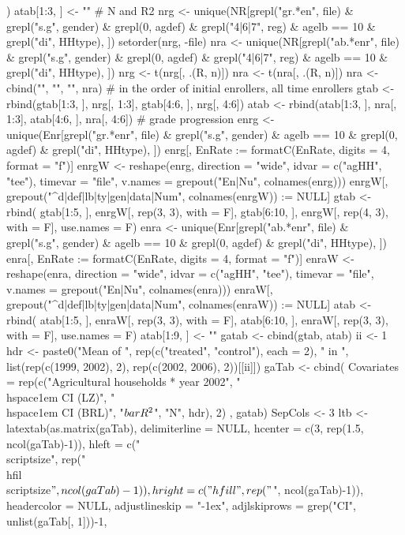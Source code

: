 \begin{Schunk}
\begin{Sinput}
   )
atab[1:3, ] <- ""
# N and R2
nrg <- unique(NR[grepl("gr.*en", file) & grepl("s.g", gender) &
  grepl(0, agdef) & grepl("4|6|7", reg) & 
  agelb == 10 & grepl("di", HHtype), ])
setorder(nrg, -file)
nra <- unique(NR[grepl("ab.*enr", file) & grepl("s.g", gender) &
  grepl(0, agdef) & grepl("4|6|7", reg) & 
  agelb == 10 & grepl("di", HHtype), ])
nrg <- t(nrg[, .(R, n)])
nra <- t(nra[, .(R, n)])
nra <- cbind("", "", "", nra)
# in the order of initial enrollers, all time enrollers
gtab <- rbind(gtab[1:3, ], nrg[, 1:3], gtab[4:6, ], nrg[, 4:6]) 
atab <- rbind(atab[1:3, ], nra[, 1:3], atab[4:6, ], nra[, 4:6]) 
# grade progression
enrg <- unique(Enr[grepl("gr.*enr", file) & grepl("s.g", gender) &
  agelb == 10 & grepl(0, agdef) & grepl("di", HHtype), ])
enrg[, EnRate := formatC(EnRate, digits = 4, format = "f")]
enrgW <- reshape(enrg, direction = "wide", idvar = c("agHH", "tee"),
  timevar = "file", v.names = grepout("En|Nu", colnames(enrg)))
enrgW[, grepout("^d|def|lb|ty|gen|data|Num", colnames(enrgW)) := NULL]
gtab <- rbind(
  gtab[1:5, ], enrgW[, rep(3, 3), with = F], 
  gtab[6:10, ], enrgW[, rep(4, 3), with = F], 
  use.names = F)
enra <- unique(Enr[grepl("ab.*enr", file) & grepl("s.g", gender) &
  agelb == 10 & grepl(0, agdef) & grepl("di", HHtype), ])
enra[, EnRate := formatC(EnRate, digits = 4, format = "f")]
enraW <- reshape(enra, direction = "wide", idvar = c("agHH", "tee"),
  timevar = "file", v.names = grepout("En|Nu", colnames(enra)))
enraW[, grepout("^d|def|lb|ty|gen|data|Num", colnames(enraW)) := NULL]
atab <- rbind(
  atab[1:5, ], enraW[, rep(3, 3), with = F], 
  atab[6:10, ], enraW[, rep(3, 3), with = F], 
  use.names = F)
atab[1:9, ] <- ""
gatab <- cbind(gtab, atab)
ii <- 1
hdr <- paste0("Mean of ", rep(c("treated", "control"), each = 2), " in ", 
   list(rep(c(1999, 2002), 2), rep(c(2002, 2006), 2))[[ii]])
gaTab <- cbind(
  Covariates = rep(c("Agricultural households * year 2002", 
      "\\hspace{1em} CI (LZ)", 
      "\\hspace{1em} CI (BRL)", 
      "$\\bar{R}^{2}$", "N", hdr), 2)
  , gatab)
SepCols <- 3 
ltb <- latextab(as.matrix(gaTab), delimiterline = NULL, 
    hcenter = c(3, rep(1.5, ncol(gaTab)-1)),
    hleft = c("\\scriptsize", rep("\\hfil\\scriptsize$", ncol(gaTab)-1)), 
    hright = c("\\hfill", rep("$", ncol(gaTab)-1)),
    headercolor = NULL, 
    adjustlineskip = "-1ex", adjlskiprows = grep("CI", unlist(gaTab[, 1]))-1,

\end{Sinput}
\end{Schunk}

